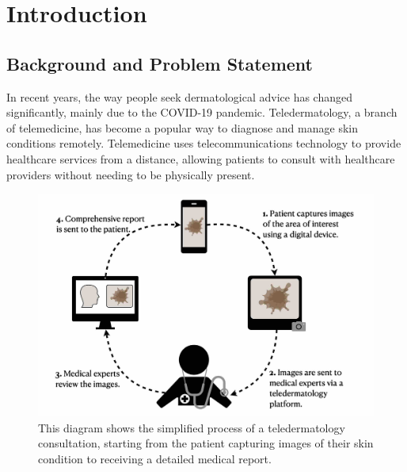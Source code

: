 \chapter{Introduction}
\label{ch:Introduction}

\section{Background and Problem Statement}
\label{sec:BackgroundProblemStatement}
In recent years, the way people seek dermatological advice has changed significantly, mainly due to the COVID-19 pandemic. Teledermatology, a branch of telemedicine, has become a popular way to diagnose and manage skin conditions remotely. Telemedicine uses telecommunications technology to provide healthcare services from a distance, allowing patients to consult with healthcare providers without needing to be physically present. \par
\vspace{\baselineskip}
\begin{figure}[ht]
    \centering
    \includegraphics[keepaspectratio,width=14cm]{img/TD_workflow.jpg}
    \caption{This diagram shows the simplified process of a teledermatology consultation, starting from the patient capturing images of their skin condition to receiving a detailed medical report.}
    \label{fig:TD_workflow}
\end{figure}

